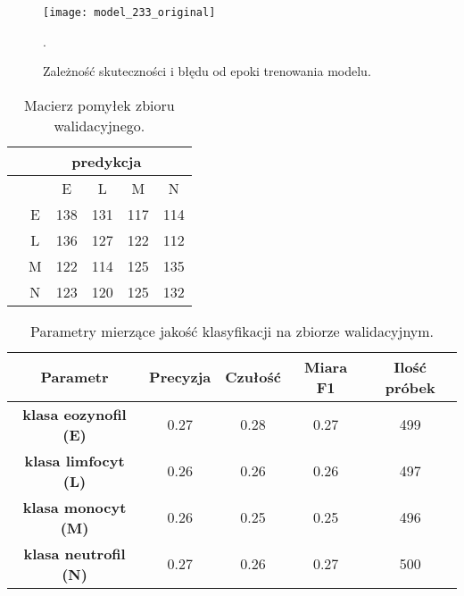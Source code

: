 {\begin{itemize}
\begin{figure}[h!]
	\centering
	\centering
		\texttt{[image: model\_233\_original]}
	\caption{Zależność skuteczności i błędu od epoki trenowania modelu.}.
	\label{fig:kaggle_3_acc_trening}
\end{figure}

\begin{table}[h!]
\centering
\caption[Short Heading]{Macierz pomyłek zbioru walidacyjnego.}
\label{tab:kaggle_3_conf_matrix}
\begin{tabular}{|c|c|c|c|c|c|}
\hline
\textbf{}                           & \multicolumn{5}{c|}{\textbf{predykcja}} \\ \hline
{\multirow{5}{*}{\rotatebox[origin=c]{90}{\textbf{klasa}}}} &         & E       & L        & M      & N       \\ \cline{2-6} 
                                    & E       & 138       & 131      & 117      & 114      \\ \cline{2-6} 
                                    & L       & 136       & 127      & 122      & 112      \\ \cline{2-6} 
                                    & M       & 122       & 114      & 125      & 135      \\ \cline{2-6} 
                                    & N       & 123      & 120      & 125      & 132       \\ \hline
\end{tabular}
\end{table}

\begin{table}[h!]
\centering
\caption[Short Heading]{Parametry mierzące jakość klasyfikacji na zbiorze walidacyjnym.}
\label{tab:kaggle_3_params_val}
\begin{tabular}{|c|c|c|c|c|}
\hline
\textbf{Parametr}                               & \textbf{Precyzja} & \textbf{Czułość} & \textbf{Miara F1} & \textbf{Ilość próbek} \\ \hline
\textbf{klasa eozynofil (E)} & 0.27   & 0.28   & 0.27 & 499  \\ \hline
\textbf{klasa limfocyt (L)} & 0.26  & 0.26 & 0.26  & 497  \\ \hline
\textbf{klasa monocyt (M)} & 0.26   & 0.25    & 0.25  & 496  \\ \hline
\textbf{klasa neutrofil (N)} & 0.27   & 0.26    & 0.27  & 500  \\ \hline
\end{tabular}
\end{table}

\end{itemize}
}
